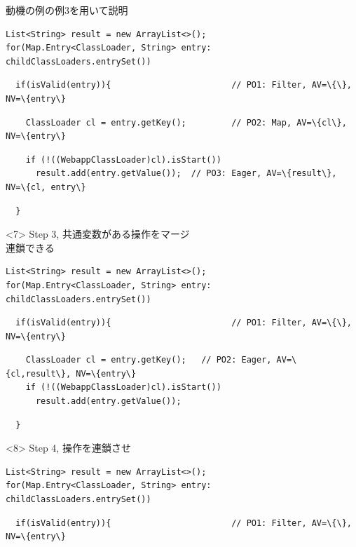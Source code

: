 \begin{frame}[fragile]{動機の例の例3を用いて説明}
\begin{onlyenv}
\begin{lstlisting}
List<String> result = new ArrayList<>();
for(Map.Entry<ClassLoader, String> entry: childClassLoaders.entrySet())
\end{lstlisting}
\begin{lstlisting}
  if(isValid(entry)){                        // PO1: Filter, AV=\{\}, NV=\{entry\}
\end{lstlisting}
\begin{lstlisting}
    ClassLoader cl = entry.getKey();         // PO2: Map, AV=\{cl\}, NV=\{entry\}
\end{lstlisting}
\begin{lstlisting}
    if (!((WebappClassLoader)cl).isStart())
      result.add(entry.getValue());  // PO3: Eager, AV=\{result\}, NV=\{cl, entry\}
\end{lstlisting}
\begin{lstlisting}
  }
\end{lstlisting}
\end{onlyenv}
\begin{onlyenv}<7>
Step 3, 共通変数がある操作をマージ\\
連鎖できる
\begin{lstlisting}
List<String> result = new ArrayList<>();
for(Map.Entry<ClassLoader, String> entry: childClassLoaders.entrySet())
\end{lstlisting}
\begin{lstlisting}
  if(isValid(entry)){                        // PO1: Filter, AV=\{\}, NV=\{entry\}
\end{lstlisting}
\begin{lstlisting}
    ClassLoader cl = entry.getKey();   // PO2: Eager, AV=\{cl,result\}, NV=\{entry\}
    if (!((WebappClassLoader)cl).isStart())
      result.add(entry.getValue());
\end{lstlisting}
\begin{lstlisting}
  }
\end{lstlisting}
\end{onlyenv}
\begin{onlyenv}<8>
Step 4, 操作を連鎖させ
\begin{lstlisting}
List<String> result = new ArrayList<>();
for(Map.Entry<ClassLoader, String> entry: childClassLoaders.entrySet())
\end{lstlisting}
\begin{lstlisting}
  if(isValid(entry)){                        // PO1: Filter, AV=\{\}, NV=\{entry\}
\end{lstlisting}
\begin{lstlisting}

\end{lstlisting}
\end{onlyenv}
\end{frame}
